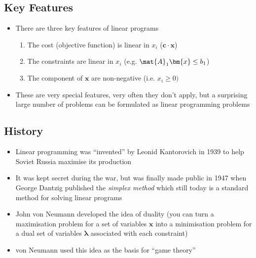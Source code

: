 
\begin{slide}
\section{Key Features}

\begin{PauseHighLight}
  \begin{itemize}
  \item There are three key features of linear programs
    \begin{enumerate}
    \item The cost (objective function) is linear in $x_i$ ($\bm{c}\cdot
      \bm{x}$)
    \item The constraints are linear in $x_i$ (e.g. $\mat{A}_1 \bm{x}
      \leq b_1 $)
    \item The component of $\bm{x}$ are non-negative (i.e. $x_i \geq 0)$\pause
    \end{enumerate}
  \item These are very special features, very often they don't apply,
    but a surprising large number of problems can be formulated as
    linear programming problems\pause
  \end{itemize}
\end{PauseHighLight}

\end{slide}


\begin{slide}
\section{History}

\begin{PauseHighLight}
  \begin{itemize}
  \item Linear programming was ``invented'' by Leonid Kantorovich in
    1939 to help Soviet Russia maximise its production\pause
  \item It was kept secret during the war, but was finally made public
    in 1947 when George Dantzig published the \emph{simplex method}
    which still today is a standard method for solving linear
    programs\pause
  \item John von Neumann developed the idea of duality (you can turn a
    maximisation problem for a set of variables $\bm{x}$ into a
    minimisation problem for a dual set of variables $\bm{\lambda}$
    associated with each constraint)\pause
  \item von Neumann used this idea as the basis for ``game theory''\pause
  \end{itemize}
\end{PauseHighLight}

\end{slide}

